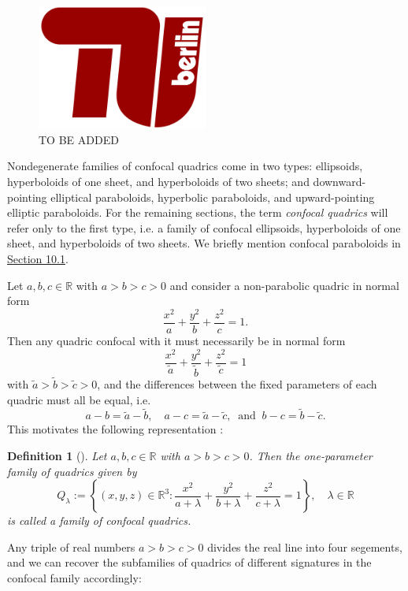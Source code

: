 \documentclass[12pt,a4paper]{article}
\theoremstyle{BoldTopSpacing}
\theoremstyle{BoldTopSpacing}
\theoremstyle{BoldTopSpacing}
\theoremstyle{BoldTopBottomSpacing}
\newtheorem{definition}{Definition}[section]
\theoremstyle{BoldTopSpacing}
\theoremstyle{BoldTopBottomSpacing}
\theoremstyle{remark}
\begin{document}
\begin{figure}[H]
    \centering
    \includegraphics[width=0.5\textwidth]{TU-Berlin-Logo.png}
    \caption{TO BE ADDED}
    \label{fig:figgg}
\end{figure}

Nondegenerate families of confocal quadrics come in two types: ellipsoids, hyperboloids of one sheet, and hyperboloids of two sheets; and downward-pointing elliptical paraboloids, hyperbolic paraboloids, and upward-pointing elliptic paraboloids. For the remaining sections, the term \textit{confocal quadrics} will refer only to the first type, i.e. a family of confocal ellipsoids, hyperboloids of one sheet, and hyperboloids of two sheets. We briefly mention confocal paraboloids in \hyperref[subsec:confocal-paraboloids]{Section 10.1}.\par

Let $a, b, c \in \mathbb{R}$ with $a > b > c > 0$ and consider a non-parabolic quadric in normal form
\[
    \frac{x^2}{a} + \frac{y^2}{b} + \frac{z^2}{c} = 1.
\]
Then any quadric confocal with it must necessarily be in normal form
\[
    \frac{x^2}{\tilde{a}} + \frac{y^2}{\tilde{b}} + \frac{z^2}{\tilde{c}} = 1
\]
with $\tilde{a} > \tilde{b} > \tilde{c} > 0$, and the differences between the fixed parameters of each quadric must all be equal, i.e.
\[
    a - b = \tilde{a} - \tilde{b}, \quad a - c = \tilde{a} - \tilde{c}, \ \text{ and } \  b - c = \tilde{b} - \tilde{c}.
\]
This motivates the following representation \cite{}:

\begin{definition}[]
\label{def:family-of-confocal-quadrics}
Let $a, b, c \in \mathbb{R}$ with $a > b > c > 0$. Then the one-parameter family of quadrics given by
\[
    Q_{\lambda} := \left\{ (x, y, z) \in \mathbb{R}^3 : \frac{x^2}{a + \lambda} + \frac{y^2}{b + \lambda} + \frac{z^2}{c + \lambda} = 1 \right\}, \quad \lambda \in \mathbb{R}
\]
is called a family of confocal quadrics.
\end{definition}

Any triple of real numbers $a > b > c > 0$ divides the real line into four segements, and we can recover the subfamilies of quadrics of different signatures in the confocal family accordingly:
\end{document}
